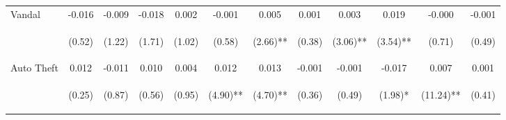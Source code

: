 \begin{tabular}{lccccccccccc}
\noalign{\smallskip}Vandal & -0.016 & -0.009 & -0.018 & 0.002 & -0.001 & 0.005 & 0.001 & 0.003 & 0.019 & -0.000 & -0.001\\
 & \begin{footnotesize}(0.52)\end{footnotesize} & \begin{footnotesize}(1.22)\end{footnotesize} & \begin{footnotesize}(1.71)\end{footnotesize} & \begin{footnotesize}(1.02)\end{footnotesize} & \begin{footnotesize}(0.58)\end{footnotesize} & \begin{footnotesize}(2.66)**\end{footnotesize} & \begin{footnotesize}(0.38)\end{footnotesize} & \begin{footnotesize}(3.06)**\end{footnotesize} & \begin{footnotesize}(3.54)**\end{footnotesize} & \begin{footnotesize}(0.71)\end{footnotesize} & \begin{footnotesize}(0.49)\end{footnotesize}\\
\noalign{\smallskip}Auto Theft & 0.012 & -0.011 & 0.010 & 0.004 & 0.012 & 0.013 & -0.001 & -0.001 & -0.017 & 0.007 & 0.001\\
 & \begin{footnotesize}(0.25)\end{footnotesize} & \begin{footnotesize}(0.87)\end{footnotesize} & \begin{footnotesize}(0.56)\end{footnotesize} & \begin{footnotesize}(0.95)\end{footnotesize} & \begin{footnotesize}(4.90)**\end{footnotesize} & \begin{footnotesize}(4.70)**\end{footnotesize} & \begin{footnotesize}(0.36)\end{footnotesize} & \begin{footnotesize}(0.49)\end{footnotesize} & \begin{footnotesize}(1.98)*\end{footnotesize} & \begin{footnotesize}(11.24)**\end{footnotesize} & \begin{footnotesize}(0.41)\end{footnotesize}\\

\end{tabular}
